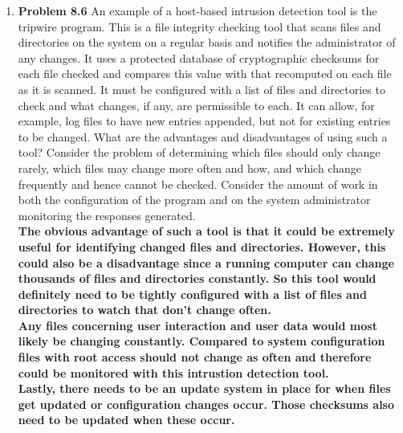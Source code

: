 \documentclass[12pt]{article}
\begin{document}
\begin{enumerate}
  \item \textbf{Problem 8.6} An example of a host-based intrusion detection tool is the tripwire program. This is a file integrity checking tool that scans files and directories on the system on a regular basis and notifies the administrator of any changes. It uses a protected database of cryptographic checksums for each file checked and compares this value with that recomputed on each file as it is scanned. It must be configured with a list of files and directories to check and what changes, if any, are permissible to each. It can allow, for example, log files to have new entries appended, but not for existing entries to be changed. What are the advantages and disadvantages of using such a tool? Consider the problem of determining which files should only change rarely, which files may change more often and how, and which change frequently and hence cannot be checked. Consider the amount of work in both the configuration of the program and on the system administrator monitoring the responses generated.\\

  \textbf{The obvious advantage of such a tool is that it could be extremely useful for identifying changed files and directories. However, this could also be a disadvantage since a running computer can change thousands of files and directories constantly. So this tool would definitely need to be tightly configured with a list of files and directories to watch that don't change often.}\\

  \textbf{Any files concerning user interaction and user data would most likely be changing constantly. Compared to system configuration files with root access should not change as often and therefore could be monitored with this intrustion detection tool.}\\

  \textbf{Lastly, there needs to be an update system in place for when files get updated or configuration changes occur. Those checksums also need to be updated when these occur.}\\


\end{enumerate}
\end{document}
